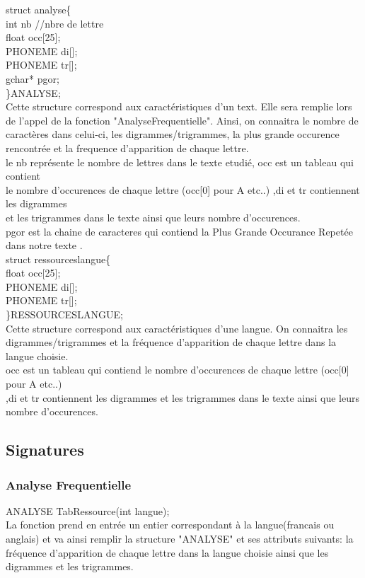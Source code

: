 \documentclass[a4]{article}
\begin{document}
	struct analyse\{ \\
		int nb //nbre de lettre \\
		float occ[25];\\
		PHONEME di[];\\
		PHONEME tr[];\\
		gchar* pgor;\\
	\}ANALYSE;\\
	Cette structure correspond aux caractéristiques d'un text. Elle sera remplie lors de
	l'appel de la fonction "AnalyseFrequentielle". Ainsi, on connaitra
	le nombre de caractères dans celui-ci, les digrammes/trigrammes, la plus grande occurence
	rencontrée et la frequence d'apparition de chaque lettre.\\
	le nb représente le nombre de lettres dans le texte etudié, occ est un tableau qui contient \\
	le nombre d'occurences de chaque lettre (occ[0] pour A etc..) ,di et tr contiennent les digrammes \\
	et les trigrammes dans le texte ainsi que leurs nombre d'occurences.\\
	pgor est la chaine de caracteres qui contiend la Plus Grande Occurance Repetée dans notre texte .\\
	
	
	struct ressourceslangue\{ \\
		float occ[25];\\
		PHONEME di[];\\
		PHONEME tr[];\\
	\}RESSOURCESLANGUE;\\
	Cette structure correspond aux caractéristiques d'une langue. On connaitra
	les digrammes/trigrammes et la fréquence d'apparition de chaque lettre dans la langue choisie.\\
	occ est un tableau qui contiend le nombre d'occurences de chaque lettre (occ[0] pour A etc..) \\
	,di et tr contiennent les digrammes et les trigrammes dans le texte ainsi que leurs nombre d'occurences.
		\subsection{Signatures}
		
	
	\subsubsection{Analyse Frequentielle}
	ANALYSE TabRessource(int langue);\\
		La fonction prend en entrée un entier correspondant à la langue(francais ou anglais)
		et va ainsi remplir la structure "ANALYSE" et ses attributs suivants:
		la fréquence d'apparition de chaque lettre dans la langue choisie ainsi que les digrammes
		et les trigrammes.\\
		
\end{document}
